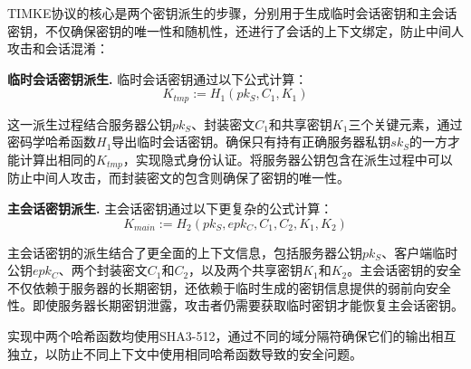 TIMKE协议的核心是两个密钥派生的步骤，分别用于生成临时会话密钥和主会话密钥，不仅确保密钥的唯一性和随机性，还进行了会话的上下文绑定，防止中间人攻击和会话混淆：

\textbf{临时会话密钥派生.} 临时会话密钥通过以下公式计算：
\begin{equation}
K_{tmp} := H_1(pk_S, C_1, K_1)
\end{equation}

这一派生过程结合服务器公钥$pk_S$、封装密文$C_1$和共享密钥$K_1$三个关键元素，通过密码学哈希函数$H_1$导出临时会话密钥。确保只有持有正确服务器私钥$sk_S$的一方才能计算出相同的$K_{tmp}$，实现隐式身份认证。将服务器公钥包含在派生过程中可以防止中间人攻击，而封装密文的包含则确保了密钥的唯一性。

\textbf{主会话密钥派生.} 主会话密钥通过以下更复杂的公式计算：
\begin{equation}
K_{main} := H_2(pk_S, epk_C, C_1, C_2, K_1, K_2)
\end{equation}

主会话密钥的派生结合了更全面的上下文信息，包括服务器公钥$pk_S$、客户端临时公钥$epk_C$、两个封装密文$C_1$和$C_2$，以及两个共享密钥$K_1$和$K_2$。主会话密钥的安全不仅依赖于服务器的长期密钥，还依赖于临时生成的密钥信息提供的弱前向安全性。即使服务器长期密钥泄露，攻击者仍需要获取临时密钥才能恢复主会话密钥。

实现中两个哈希函数均使用SHA3-512，通过不同的域分隔符确保它们的输出相互独立，以防止不同上下文中使用相同哈希函数导致的安全问题。